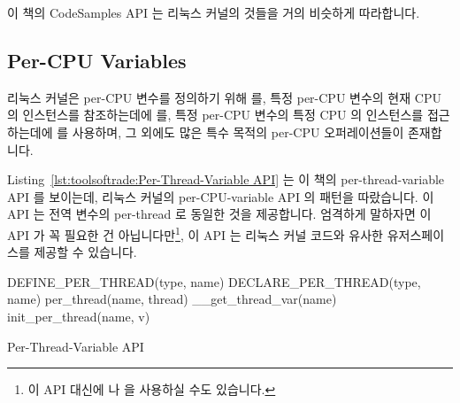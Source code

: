 이 책의 CodeSamples API 는 리눅스 커널의 것들을 거의 비슷하게 따라합니다.

\subsection{Per-CPU Variables}
\label{sec:toolsoftrade:Per-CPU Variables}

리눅스 커널은 per-CPU 변수를 정의하기 위해  를, 특정
per-CPU 변수의 현재 CPU 의 인스턴스를 참조하는데에  를, 특정
per-CPU 변수의 특정 CPU 의 인스턴스를 접근하는데에  를 사용하며,
그 외에도 많은 특수 목적의 per-CPU 오퍼레이션들이 존재합니다.

Listing~\ref{lst:toolsoftrade:Per-Thread-Variable API}
는 이 책의 per-thread-variable API 를 보이는데, 리눅스 커널의 per-CPU-variable
API 의 패턴을 따랐습니다.
이 API 는 전역 변수의 per-thread 로 동일한 것을 제공합니다.
엄격하게 말하자면 이 API 가 꼭 필요한 건 아닙니다만\footnote{
	이 API 대신에  나  을 사용하실 수도
	있습니다.},
이 API 는 리눅스 커널 코드와 유사한 유저스페이스를 제공할 수 있습니다.

\begin{listing}[htbp]
{ \scriptsize
\begin{verbbox}
DEFINE_PER_THREAD(type, name)
DECLARE_PER_THREAD(type, name)
per_thread(name, thread)
__get_thread_var(name)
init_per_thread(name, v)
\end{verbbox}
}
\centering
\theverbbox
\caption{Per-Thread-Variable API}
\label{lst:toolsoftrade:Per-Thread-Variable API}
\end{listing}

